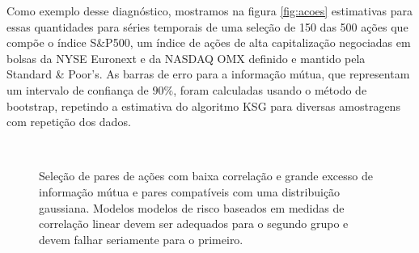 Como exemplo desse diagnóstico, mostramos na figura \ref{fig:acoes} estimativas para essas quantidades para séries temporais de uma seleção de 150 das 500 ações que compõe o índice S\&P500, um índice de ações de alta capitalização negociadas em bolsas da NYSE Euronext e da NASDAQ OMX definido e mantido pela Standard \& Poor's. As barras de erro para a informação mútua, que representam um intervalo de confiança de $90\%$, foram calculadas usando o método de bootstrap, repetindo a estimativa do algoritmo KSG\cite{Kraskov2004} para diversas amostragens com repetição dos dados.
\begin{figure}
 \\
 \caption[Seleção de pares de ações.]{Seleção de pares de ações com baixa correlação e grande excesso de informação mútua e pares compatíveis com uma distribuição gaussiana. Modelos modelos de risco baseados em medidas de correlação linear devem ser adequados para o segundo grupo e devem falhar seriamente para o primeiro.}
 \label{fig:locohimi}
\end{figure}

